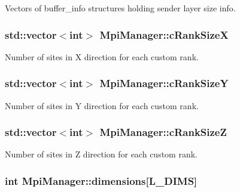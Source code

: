 Vectors of buffer\+\_\+info structures holding sender layer size info. 

\subsubsection[{\texorpdfstring{c\+Rank\+SizeX}{cRankSizeX}}]{\setlength{\rightskip}{0pt plus 5cm}std\+::vector$<$int$>$ Mpi\+Manager\+::c\+Rank\+SizeX}\hypertarget{class_mpi_manager_a54ce152f90bd51ff99f71e1011983977}{}\label{class_mpi_manager_a54ce152f90bd51ff99f71e1011983977}


Number of sites in X direction for each custom rank. 

\subsubsection[{\texorpdfstring{c\+Rank\+SizeY}{cRankSizeY}}]{\setlength{\rightskip}{0pt plus 5cm}std\+::vector$<$int$>$ Mpi\+Manager\+::c\+Rank\+SizeY}\hypertarget{class_mpi_manager_a4d583991c966c8eb44a52cbbb6ae4662}{}\label{class_mpi_manager_a4d583991c966c8eb44a52cbbb6ae4662}


Number of sites in Y direction for each custom rank. 

\subsubsection[{\texorpdfstring{c\+Rank\+SizeZ}{cRankSizeZ}}]{\setlength{\rightskip}{0pt plus 5cm}std\+::vector$<$int$>$ Mpi\+Manager\+::c\+Rank\+SizeZ}\hypertarget{class_mpi_manager_a17c2968f4c799dcadfa7bb8788eabaa1}{}\label{class_mpi_manager_a17c2968f4c799dcadfa7bb8788eabaa1}


Number of sites in Z direction for each custom rank. 

\subsubsection[{\texorpdfstring{dimensions}{dimensions}}]{\setlength{\rightskip}{0pt plus 5cm}int Mpi\+Manager\+::dimensions\mbox{[}{\bf L\+\_\+\+D\+I\+MS}\mbox{]}}\hypertarget{class_mpi_manager_a8d486f77671328cdc139f6cef2a4006f}{}\label{class_mpi_manager_a8d486f77671328cdc139f6cef2a4006f}


